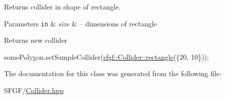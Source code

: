 Returns collider in shape of rectangle. 


\begin{DoxyParams}[1]{Parameters}
\mbox{\tt in}  & {\em size} & – dimensions of rectangle\\
\hline
\end{DoxyParams}
\begin{DoxyReturn}{Returns}
new collider
\end{DoxyReturn}

\begin{DoxyCode}
somePolygon.setSampleCollider(\hyperlink{classsfgf_1_1Collider_aaf00da4b750ec490048de061c98d8ad0}{sfgf::Collider::rectangle}(\{20, 10\}));
\end{DoxyCode}
 

The documentation for this class was generated from the following file\+:\begin{DoxyCompactItemize}
\item 
S\+F\+G\+F/\hyperlink{Collider_8hpp}{Collider.\+hpp}\end{DoxyCompactItemize}
